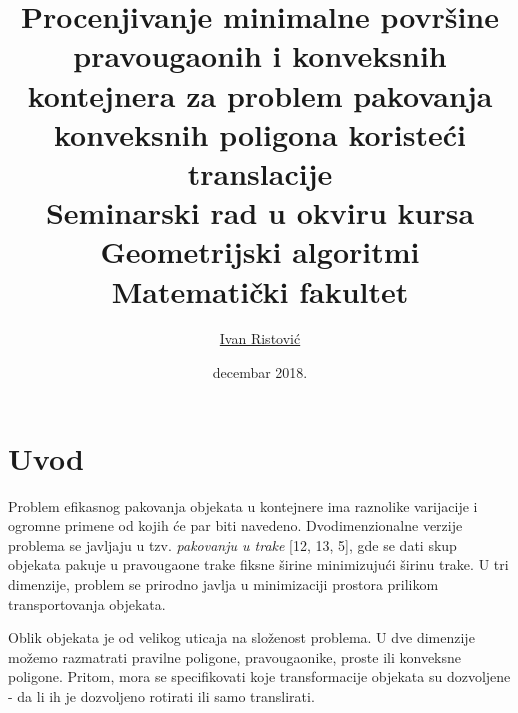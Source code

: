 \documentclass[a4paper]{article}
\theoremstyle{plain}
\theoremstyle{definition}
\begin{document}
\title{Procenjivanje minimalne povr\v{s}ine pravougaonih i konveksnih kontejnera za problem pakovanja konveksnih poligona koriste\'c{}i translacije\\  \small{Seminarski rad u okviru kursa\\Geometrijski algoritmi\\ Matematički fakultet}}

\author{\href{mailto:mi14042@matf.bg.ac.rs}{Ivan Ristovi\'c}}
\date{decembar 2018.}

\maketitle


\tableofcontents

\newpage

\section{Uvod}
\label{sec:Uvod}

Problem efikasnog pakovanja objekata u kontejnere ima raznolike varijacije i ogromne primene od kojih \'c{}e par biti navedeno. Dvodimenzionalne verzije problema se javljaju u tzv. \emph{pakovanju u trake} \cite{paper} [12, 13, 5], gde se dati skup objekata pakuje u pravougaone trake fiksne \v{s}irine minimizuju\'c{}i \v{s}irinu trake. U tri dimenzije, problem se prirodno javlja u minimizaciji prostora prilikom transportovanja objekata.

Oblik objekata je od velikog uticaja na slo\v{z}enost problema. U dve dimenzije mo\v{z}emo razmatrati pravilne poligone, pravougaonike, proste ili konveksne poligone. Pritom, mora se specifikovati koje transformacije objekata su dozvoljene - da li ih je dozvoljeno rotirati ili samo translirati. 
\end{document}

